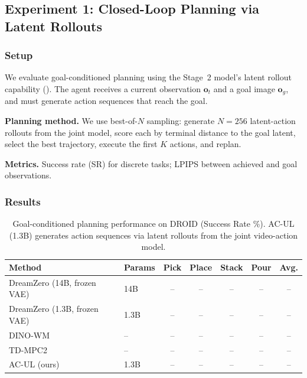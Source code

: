\documentclass{article}
\newcommand{\vo}{\bm{o}}
\begin{document}
\subsection{Experiment 1: Closed-Loop Planning via Latent Rollouts}
\label{sec:exp_planning}

\subsubsection{Setup}

We evaluate goal-conditioned planning using the Stage~2 model's latent rollout capability (). The agent receives a current observation $\vo_t$ and a goal image $\vo_g$, and must generate action sequences that reach the goal.

\textbf{Planning method.}
We use best-of-$N$ sampling: generate $N = 256$ latent-action rollouts from the joint model, score each by terminal distance to the goal latent, select the best trajectory, execute the first $K$ actions, and replan.

\textbf{Metrics.}
Success rate (SR) for discrete tasks; LPIPS between achieved and goal observations.

\subsubsection{Results}

\begin{table}[t]
\centering
\caption{Goal-conditioned planning performance on DROID (Success Rate \%). AC-UL (1.3B) generates action sequences via latent rollouts from the joint video-action model.}
\label{tab:planning}
\begin{tabular}{llccccc}
\toprule
\textbf{Method} & \textbf{Params} & \textbf{Pick} & \textbf{Place} & \textbf{Stack} & \textbf{Pour} & \textbf{Avg.} \\
\midrule
DreamZero (14B, frozen VAE)   & 14B  & -- & -- & -- & -- & -- \\
DreamZero (1.3B, frozen VAE)  & 1.3B & -- & -- & -- & -- & -- \\
DINO-WM                       & --   & -- & -- & -- & -- & -- \\
TD-MPC2                       & --   & -- & -- & -- & -- & -- \\
\midrule
AC-UL (ours)                  & 1.3B & -- & -- & -- & -- & -- \\
\bottomrule
\end{tabular}
\end{table}
\end{document}
